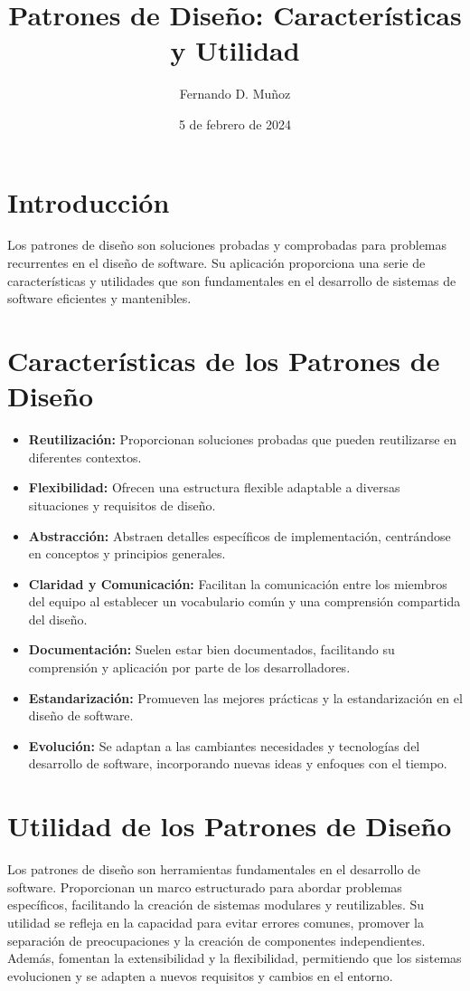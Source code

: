 \documentclass{article}
\title{Patrones de Diseño: Características y Utilidad}
\author{Fernando D. Muñoz}
\date{5 de febrero de 2024}
\begin{document}
 
	
	\section{Introducción}
	Los patrones de diseño son soluciones probadas y comprobadas para problemas recurrentes en el diseño de software. Su aplicación proporciona una serie de características y utilidades que son fundamentales en el desarrollo de sistemas de software eficientes y mantenibles.

	\section{Características de los Patrones de Diseño}
	\begin{itemize}
		\item \textbf{Reutilización:} Proporcionan soluciones probadas que pueden reutilizarse en diferentes contextos.
		\item \textbf{Flexibilidad:} Ofrecen una estructura flexible adaptable a diversas situaciones y requisitos de diseño.
		\item \textbf{Abstracción:} Abstraen detalles específicos de implementación, centrándose en conceptos y principios generales.
		\item \textbf{Claridad y Comunicación:} Facilitan la comunicación entre los miembros del equipo al establecer un vocabulario común y una comprensión compartida del diseño.
		\item \textbf{Documentación:} Suelen estar bien documentados, facilitando su comprensión y aplicación por parte de los desarrolladores.
		\item \textbf{Estandarización:} Promueven las mejores prácticas y la estandarización en el diseño de software.
		\item \textbf{Evolución:} Se adaptan a las cambiantes necesidades y tecnologías del desarrollo de software, incorporando nuevas ideas y enfoques con el tiempo.
	\end{itemize}

	\section{Utilidad de los Patrones de Diseño}
	Los patrones de diseño son herramientas fundamentales en el desarrollo de software. Proporcionan un marco estructurado para abordar problemas específicos, facilitando la creación de sistemas modulares y reutilizables. Su utilidad se refleja en la capacidad para evitar errores comunes, promover la separación de preocupaciones y la creación de componentes independientes. Además, fomentan la extensibilidad y la flexibilidad, permitiendo que los sistemas evolucionen y se adapten a nuevos requisitos y cambios en el entorno.
\end{document}
